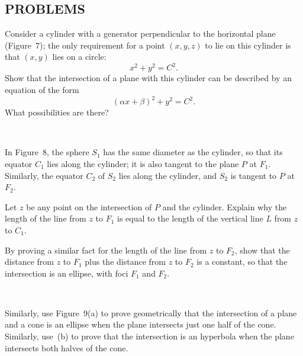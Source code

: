 \subsection*{PROBLEMS}

 Consider a cylinder with a generator perpendicular to the horizontal
plane (Figure~7); the only requirement for a point $(x,y,z)$ to lie on this
cylinder is that $(x,y)$ lies on a circle:
\[
x^2+y^2=C^2.
\]
Show that the intersection of a plane with this cylinder can be described by
an equation of the form
\[
(\alpha x+\beta)^2+y^2=C^2.
\]
What possibilities are there?

\begin{center}
\\[0.6em]
\end{center}

 In Figure~8, the sphere $S_1$ has the same diameter as the cylinder,
so that its equator $C_1$ lies along the cylinder; it is also tangent to the
plane $P$ at $F_1$. Similarly, the equator $C_2$ of $S_2$ lies along the
cylinder, and $S_2$ is tangent to $P$ at $F_2$.
\begin{letters}
\item Let $z$ be any point on the intersection of $P$ and the cylinder. Explain
  why the length of the line from $z$ to $F_1$ is equal to the length of the
  vertical line $L$ from $z$ to $C_1$.
\item By proving a similar fact for the length of the line from $z$ to $F_2$,
  show that the distance from $z$ to $F_1$ plus the distance from $z$ to $F_2$
  is a constant, so that the intersection is an ellipse, with foci $F_1$ and
  $F_2$.
\end{letters}

\begin{center}
\\[0.6em]
\end{center}

 Similarly, use Figure~9(a) to prove geometrically that the
intersection of a plane and a cone is an ellipse when the plane intersects just
one half of the cone. Similarly, use~(b) to prove that the intersection is an
hyperbola when the plane intersects both halves of the cone.

\begin{center}
\\[0.6em]
\end{center}

